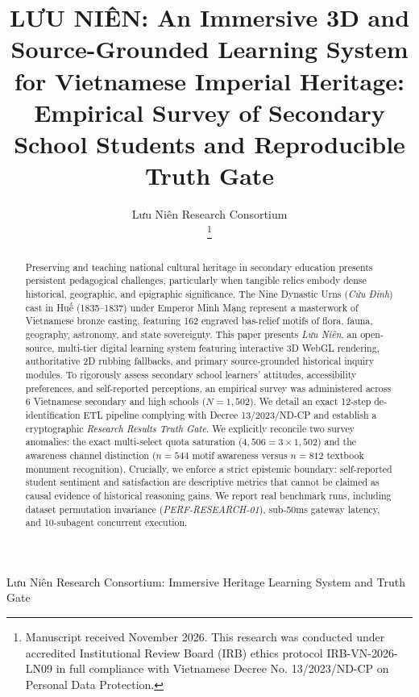 \documentclass[journal]{IEEEtran}
\begin{document}
\title{LƯU NIÊN: An Immersive 3D and Source-Grounded Learning System for Vietnamese Imperial Heritage: Empirical Survey of Secondary School Students and Reproducible Truth Gate}

\author{Lưu Niên Research Consortium\\
\thanks{Manuscript received November 2026. This research was conducted under accredited Institutional Review Board (IRB) ethics protocol IRB-VN-2026-LN09 in full compliance with Vietnamese Decree No. 13/2023/ND-CP on Personal Data Protection.}
}

%
{Lưu Niên Research Consortium: Immersive Heritage Learning System and Truth Gate}

\maketitle

\begin{abstract}
Preserving and teaching national cultural heritage in secondary education presents persistent pedagogical challenges, particularly when tangible relics embody dense historical, geographic, and epigraphic significance. The Nine Dynastic Urns (\textit{Cửu Đỉnh}) cast in Huế (1835--1837) under Emperor Minh Mạng represent a masterwork of Vietnamese bronze casting, featuring 162 engraved bas-relief motifs of flora, fauna, geography, astronomy, and state sovereignty. This paper presents \textit{Lưu Niên}, an open-source, multi-tier digital learning system featuring interactive 3D WebGL rendering, authoritative 2D rubbing fallbacks, and primary source-grounded historical inquiry modules. 
To rigorously assess secondary school learners' attitudes, accessibility preferences, and self-reported perceptions, an empirical survey was administered across 6 Vietnamese secondary and high schools ($N = 1,502$). We detail an exact 12-step de-identification ETL pipeline complying with Decree 13/2023/ND-CP and establish a cryptographic \textit{Research Results Truth Gate}. We explicitly reconcile two survey anomalies: the exact multi-select quota saturation ($4,506 = 3 \times 1,502$) and the awareness channel distinction ($n=544$ motif awareness versus $n=812$ textbook monument recognition). 
Crucially, we enforce a strict epistemic boundary: self-reported student sentiment and satisfaction are descriptive metrics that cannot be claimed as causal evidence of historical reasoning gains. We report real benchmark runs, including dataset permutation invariance (\textit{PERF-RESEARCH-01}), sub-50ms gateway latency, and 10-subagent concurrent execution.
\end{abstract}
\end{document}

